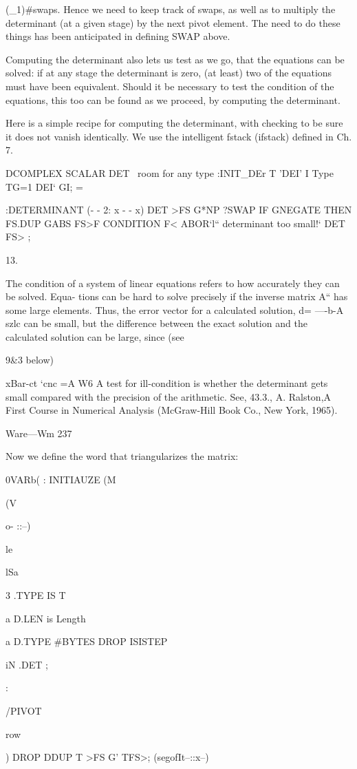 {{{{{{{{{{{(_1)#swaps. Hence we need to keep track of swaps, as well as to
multiply the determinant (at a given stage) by the next pivot
element. The need to do these things has been anticipated in
defining }SWAP above.

Computing the determinant also lets us test as we go, that the
equations can be solved: if at any stage the determinant is zero,
(at least) two of the equations must have been equivalent. Should
it be necessary to test the condition of the equations, this too
can be found as we proceed, by computing the determinant.

Here is a simple recipe for computing the determinant, with
checking to be sure it does not vanish identically. We use the
intelligent fstack (ifstack) deﬁned in Ch. 7.

DCOMPLEX SCALAR DET \ room for any type
:INIT_DEr T 'DEI' I \set Type
TG=1 DEI‘ GI; \setdet=


:DETERMINANT (- - 2: x - - x)
DET >FS G*NP
?SWAP IF GNEGATE THEN
FS.DUP GABS FS>F CONDITION F<
ABOR‘l“ determinant too small!‘ DET FS> ;

 

13.

The condition of a system of linear equations refers to how accurately they can be solved. Equa-
tions can be hard to solve precisely if the inverse matrix A“ has some large elements. Thus, the
error vector for a calculated solution, d= —-b-A szlc can be small, but the difference between the
exact solution and the calculated solution can be large, since (see {9&3 below)

xBar-ct ‘cnc =A W6
A test for ill-condition is whether the determinant gets small compared with the precision of the
arithmetic. See, 43.3., A. Ralston,A First Course in Numerical Analysis (McGraw-Hill Book Co.,
New York, 1965).

Ware—Wm 237

Now we deﬁne the word that triangularizes the matrix:

0VARb( \tokeepthesteokehort
: INITIAUZE (M{(V{o- ::--)

le

lSa

3 .TYPE IS T

a D.LEN is Length

a D.TYPE #BYTES DROP ISISTEP

iN .DET ; 

:}/PIVOT }row{) DROP DDUP T >FS G' TFS>;
(segofIt--::x--)

}}}}}}}}}}}}
